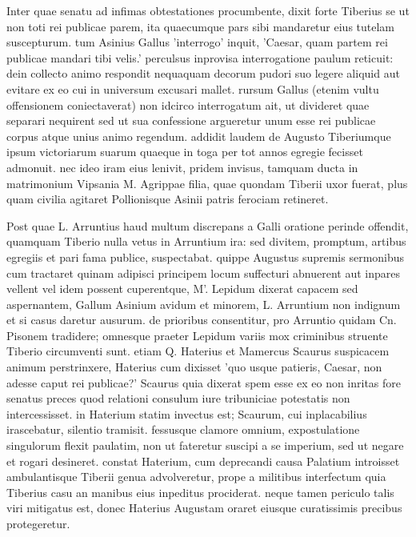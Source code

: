 \documentclass[10pt]{article}
\begin{document}
  \beginnumbering
Inter quae senatu ad infimas obtestationes procumbente, dixit forte Tiberius se ut non toti rei publicae parem, ita quaecumque pars sibi mandaretur eius tutelam suscepturum. tum Asinius Gallus 'interrogo' inquit, 'Caesar, quam partem rei publicae mandari tibi velis.' perculsus inprovisa interrogatione paulum reticuit: dein collecto animo respondit nequaquam decorum pudori suo legere aliquid aut evitare ex eo cui in universum excusari mallet. rursum Gallus (etenim vultu offensionem coniectaverat) non idcirco interrogatum ait, ut divideret quae separari nequirent sed ut sua confessione argueretur unum esse rei publicae corpus atque unius animo regendum. addidit laudem de Augusto Tiberiumque ipsum victoriarum suarum quaeque in toga per tot annos egregie fecisset admonuit. nec ideo iram eius lenivit, pridem invisus, tamquam ducta in matrimonium Vipsania M. Agrippae filia, quae quondam Tiberii uxor fuerat, plus quam civilia agitaret Pollionisque Asinii patris ferociam retineret.
  \pend

Post quae L. Arruntius haud multum discrepans a Galli oratione perinde offendit, quamquam Tiberio nulla vetus in Arruntium ira: sed divitem, promptum, artibus egregiis et pari fama publice, suspectabat. quippe Augustus supremis sermonibus cum tractaret quinam adipisci principem locum suffecturi abnuerent aut inpares vellent vel idem possent cuperentque, M'. Lepidum dixerat capacem sed aspernantem, Gallum Asinium avidum et minorem, L. Arruntium non indignum et si casus daretur ausurum. de prioribus consentitur, pro Arruntio quidam Cn. Pisonem tradidere; omnesque praeter Lepidum variis mox criminibus struente Tiberio circumventi sunt. etiam Q. Haterius et Mamercus Scaurus suspicacem animum perstrinxere, Haterius cum dixisset 'quo usque patieris, Caesar, non adesse caput rei publicae?' Scaurus quia dixerat spem esse ex eo non inritas fore senatus preces quod relationi consulum iure tribuniciae potestatis non intercessisset. in Haterium statim invectus est; Scaurum, cui inplacabilius irascebatur, silentio tramisit. fessusque clamore omnium, expostulatione singulorum flexit paulatim, non ut fateretur suscipi a se imperium, sed ut negare et rogari desineret. constat Haterium, cum deprecandi causa Palatium introisset ambulantisque Tiberii genua advolveretur, prope a militibus interfectum quia Tiberius casu an manibus eius inpeditus prociderat. neque tamen periculo talis viri mitigatus est, donec Haterius Augustam oraret eiusque curatissimis precibus protegeretur.
  \pend
\end{document}
